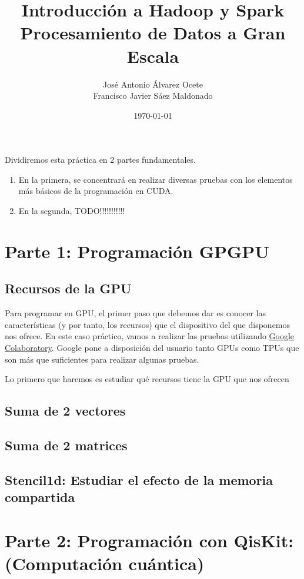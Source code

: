 \documentclass[11pt]{article}
\author{José Antonio Álvarez Ocete\\ Francisco Javier Sáez Maldonado}
\date{\today}
\title{Introducción a Hadoop y Spark\\\medskip
\large Procesamiento de Datos a Gran Escala}
\begin{document}
\maketitle

\tableofcontents

Dividiremos esta práctica en 2 partes fundamentales. 

\begin{enumerate}
	
	\item En la primera, se concentrará en realizar diversas pruebas con los elementos más básicos de la programación en CUDA.
	\item En la segunda, TODO!!!!!!!!!!!
\end{enumerate}

\section{Parte 1: Programación GPGPU}

\subsection{Recursos de la GPU}

Para programar en GPU, el primer paso que debemos dar es conocer las características (y por tanto, los recursos) que el dispositivo del que disponemos nos ofrece. En este caso práctico, vamos a realizar las pruebas utilizando \href{https://colab.research.google.com/}{Google Colaboratory}. Google pone a disposición del usuario tanto GPUs como TPUs que son más que suficientes para realizar algunas pruebas. 

Lo primero que haremos es estudiar qué recursos tiene la GPU que nos ofrecen
\subsection{Suma de 2 vectores}
\subsection{Suma de 2 matrices}
\subsection{Stencil1d: Estudiar el efecto de la memoria compartida}

\section{Parte 2: Programación con QisKit: (Computación cuántica)}
\end{document}
